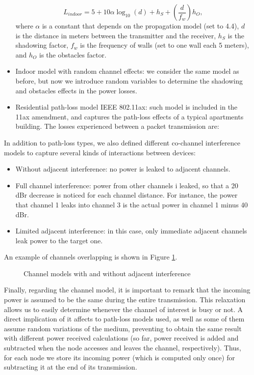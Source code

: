 \documentclass[a4paper]{article}
\begin{document}
\begin{itemize}
		\begin{equation}
			L_{indoor} = 5 + 10 \alpha \log_{10}(d) + h_S + (\frac{d}{f_w}) h_O,
			\nonumber
		\end{equation}
		where $\alpha$ is a constant that depends on the propagation model (set to 4.4), $d$ is the distance in meters between the transmitter and the receiver, $h_S$ is the shadowing factor, $f_w$ is the frequency of walls (set to one wall each 5 meters), and $h_{O}$ is the obstacles factor.
		\item Indoor model with random channel effects: we consider the same model as before, but now we introduce random variables to determine the shadowing and obstacles effects in the power losses.
		\item Residential path-loss model IEEE 802.11ax: such model is included in the 11ax amendment, and captures the path-loss effects of a typical apartments building. The losses experienced between a packet transmission are:
		\begin{equation}
			\nonumber
		\end{equation}
	\end{itemize}
	
	In addition to path-loss types, we also defined different co-channel interference models to capture several kinds of interactions between devices:
	\begin{itemize}
		\item Without adjacent interference: no power is leaked to adjacent channels.
		\item Full channel interference: power from other channels i leaked, so that a 20 dBr decrease is noticed for each channel distance. For instance, the power that channel 1 leaks into channel 3 is the actual power in channel 1 minus 40 dBr. 
		\item Limited adjacent interference: in this case, only immediate adjacent channels leak power to the target one.
	\end{itemize}
	
	An example of channels overlapping is shown in Figure \ref{fig:cochannel_interference}.
	\begin{figure}[h!]
		\centering
		\caption{Channel models with and without adjacent interference}
		\label{fig:cochannel_interference}
	\end{figure}	
		
	Finally, regarding the channel model, it is important to remark that the incoming power is assumed to be the same during the entire transmission. This relaxation allows us to easily determine whenever the channel of interest is busy or not. A direct implication of it affects to path-loss models used, as well as some of them assume random variations of the medium, preventing to obtain the same result with different power received calculations (so far, power received is added and subtracted when the node accesses and leaves the channel, respectively). Thus, for each node we store its incoming power (which is computed only once) for subtracting it at the end of its transmission. 
	
\end{document}
